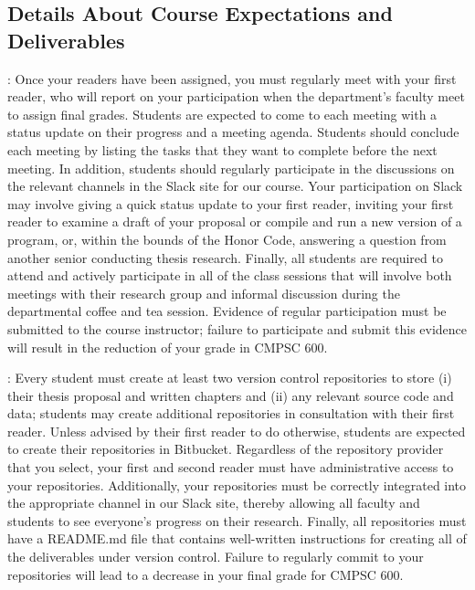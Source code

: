 \vspace*{-.25in}
\subsection*{Details About Course Expectations and Deliverables}
\vspace*{-.15in}

: Once your readers have been assigned, you must regularly meet with your first
reader, who will report on your participation when the department's faculty meet to assign final grades.  Students are
expected to come to each meeting with a status update on their progress and a meeting agenda.  Students should conclude
each meeting by listing the tasks that they want to complete before the next meeting. In addition, students should
regularly participate in the discussions on the relevant channels in the Slack site for our course. Your participation
on Slack may involve giving a quick status update to your first reader, inviting your first reader to examine a draft of
your proposal or compile and run a new version of a program, or, within the bounds of the Honor Code, answering a
question from another senior conducting thesis research.  Finally, all students are required to attend and actively
participate in all of the class sessions that will involve both meetings with their research group and informal
discussion during the departmental coffee and tea session. Evidence of regular participation must be submitted to the
course instructor; failure to participate and submit this evidence will result in the reduction of your grade in
CMPSC 600.

: Every student must create at least two version control repositories to store (i)
their thesis proposal and written chapters and (ii) any relevant source code and data; students may create additional
repositories in consultation with their first reader. Unless advised by their first reader to do otherwise, students are
expected to create their repositories in Bitbucket. Regardless of the repository provider that you select, your first
and second reader must have administrative access to your repositories. Additionally, your repositories must be
correctly integrated into the appropriate channel in our Slack site, thereby allowing all faculty and students to see
everyone's progress on their research. Finally, all repositories must have a README.md file that contains well-written
instructions for creating all of the deliverables under version control. Failure to regularly commit to
your repositories will lead to a decrease in your final grade for CMPSC 600.

